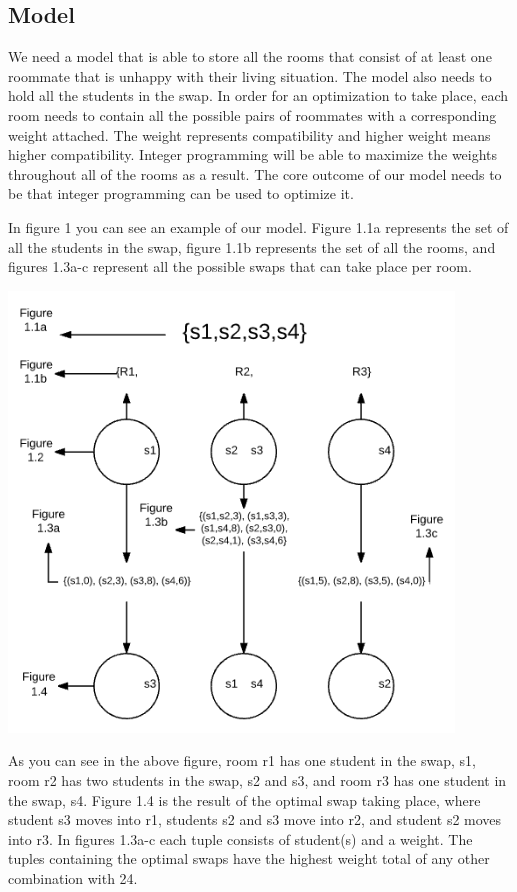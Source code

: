 \documentclass[12pt]{article}
\begin{document}
\begin{multicols}{2}
\subsection{Model}
We need a model that is able to store all the rooms that consist of at least one roommate that is unhappy with their living situation. The model also needs to hold all the students in the swap. In order for an optimization to take place, each room needs to contain all the possible pairs of roommates with a corresponding weight attached. The weight represents compatibility and higher weight means higher compatibility. Integer programming will be able to maximize the weights throughout all of the rooms as a result. The core outcome of our model needs to be that integer programming can be used to optimize it.

In figure 1 you can see an example of our model. Figure 1.1a represents the set of all the students in the swap, figure 1.1b represents the set of all the rooms, and figures 1.3a-c represent all the possible swaps that can take place per room. 

\includegraphics[scale=0.6]{model} %

As you can see in the above figure, room r1 has one student in the swap, s1, room r2 has two students in the swap, s2 and s3, and room r3 has one student in the swap, s4. Figure 1.4 is the result of the optimal swap taking place, where student s3 moves into r1, students s2 and s3 move into r2, and student s2 moves into r3. In figures 1.3a-c each tuple consists of student(s) and a weight. The tuples containing the optimal swaps have the highest weight total of any other combination with 24.


\end{multicols}
\end{document}
